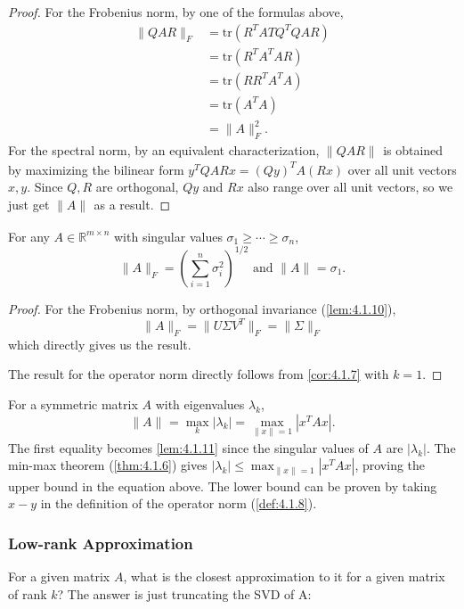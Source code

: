 \begin{proof}
For the Frobenius norm, by one of the formulas above, 
\begin{align*}
	\lVert QAR \rVert_{F} 
	&= \mathrm{tr}(R^T AT Q^T QAR) \\
	&= \mathrm{tr}(R^T A^T AR) \\
	&= \mathrm{tr}(RR^T A^T A) \\
	&= \mathrm{tr}(A^T A) \\
	&= \lVert A \rVert_{F}^2.
\end{align*}
For the spectral norm, by an equivalent characterization, $\lVert QAR \rVert_{}$ is obtained by maximizing the 
bilinear form $y^T QARx = (Qy)^T A (Rx)$ over all unit vectors $x, y$. Since $Q, R$ are orthogonal, 
$Qy$ and $Rx$ also range over all unit vectors, so we just get $\lVert A \rVert_{}$ as a result.
\end{proof}

\begin{lemma}
\label{lem:4.1.11}
For any $A \in \mathbb{R}^{m \times n}$ with singular values $\sigma_1 \geq \cdots \geq \sigma_n$, 
\[ \lVert A \rVert_{F} = \left( \sum_{i = 1}^{n} \sigma_i^2 \right)^{1/2} \text{ and } 
\lVert A \rVert_{} = \sigma_1. \]
\end{lemma}

\begin{proof}
For the Frobenius norm, by orthogonal invariance (\cref{lem:4.1.10}), 
\[ \lVert A \rVert_{F} = \lVert U \Sigma V^T \rVert_{F} = \lVert \Sigma \rVert_{F} \]
which directly gives us the result.

The result for the operator norm directly follows from \cref{cor:4.1.7} with $k = 1$.
\end{proof}

\begin{remark}
\label{rmk:4.1.12}
For a symmetric matrix $A$ with eigenvalues $\lambda_k$, 
\[ \lVert A \rVert_{} = \max_{k}|\lambda_k| = \max_{\lVert x \rVert_{} = 1} |x^T Ax|. \] 
The first equality becomes \cref{lem:4.1.11} since the singular values of $A$ are $|\lambda_k|$. The 
min-max theorem (\cref{thm:4.1.6}) gives $|\lambda_k| \leq \max_{\lVert x \rVert_{} = 1} |x^T Ax|$, proving 
the upper bound in the equation above. The lower bound can be proven by taking $x - y$ in the definition of 
the operator norm (\cref{def:4.1.8}).
\end{remark}

\subsubsection{Low-rank Approximation}
For a given matrix $A$, what is the closest approximation to it for a given matrix of rank $k$? The answer 
is just truncating the SVD of A: 

